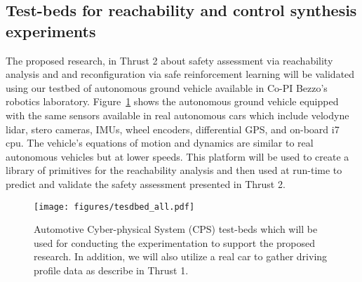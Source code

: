 \subsection{Test-beds for reachability and control synthesis experiments}
The proposed research, in Thrust 2 about safety assessment via reachability analysis and and reconfiguration via safe reinforcement learning will be validated using our testbed of autonomous ground vehicle available in Co-PI Bezzo's robotics laboratory. 
Figure~\ref{fig:all_experiments} shows the autonomous ground vehicle equipped with the same sensors available in real autonomous cars which include velodyne lidar, stero cameras, IMUs, wheel encoders, differential GPS, and on-board i7 cpu. The vehicle's equations of motion and dynamics are similar to real autonomous vehicles but at lower speeds. This platform will be used to create a library of primitives for the reachability analysis and then used at run-time to predict and validate the safety assessment presented in Thrust 2. 
\begin{figure}
    \centering
    \texttt{[image: figures/tesdbed\_all.pdf]}
    \caption{Automotive Cyber-physical System (CPS) test-beds which will be used for conducting the experimentation to support the proposed research. In addition, we will also utilize a real car to gather driving profile data as describe in Thrust 1. }
    \label{fig:all_experiments}
\end{figure}

